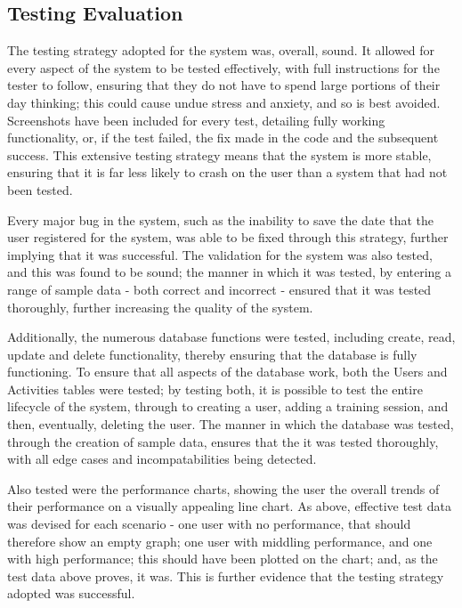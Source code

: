 \documentclass{article}[12pt,a4paper]
\begin{document}
{\subsection{Testing Evaluation}
The testing strategy adopted for the system was, overall, sound. It allowed for every aspect of the system to be tested effectively, with full instructions for the tester to follow, ensuring that they do not have to spend large portions of their day thinking; this could cause undue stress and anxiety, and so is best avoided. Screenshots have been included for every test, detailing fully working functionality, or, if the test failed, the fix made in the code and the subsequent success. This extensive testing strategy means that the system is more stable, ensuring that it is far less likely to crash on the user than a system that had not been tested.

Every major bug in the system, such as the inability to save the date that the user registered for the system, was able to be fixed through this strategy, further implying that it was successful. The validation for the system was also tested, and this was found to be sound; the manner in which it was tested, by entering a range of sample data - both correct and incorrect - ensured that it was tested thoroughly, further increasing the quality of the system.

Additionally, the numerous database functions were tested, including create, read, update and delete functionality, thereby ensuring that the database is fully functioning. To ensure that all aspects of the database work, both the Users and Activities tables were tested; by testing both, it is possible to test the entire lifecycle of the system, through to creating a user, adding a training session, and then, eventually, deleting the user. The manner in which the database was tested, through the creation of sample data, ensures that the it was tested thoroughly, with all edge cases and incompatabilities being detected.

Also tested were the performance charts, showing the user the overall trends of their performance on a visually appealing line chart. As above, effective test data was devised for each scenario - one user with no performance, that should therefore show an empty graph; one user with middling performance, and one with high performance; this should have been plotted on the chart; and, as the test data above proves, it was. This is further evidence that the testing strategy adopted was successful.

}
\end{document}
